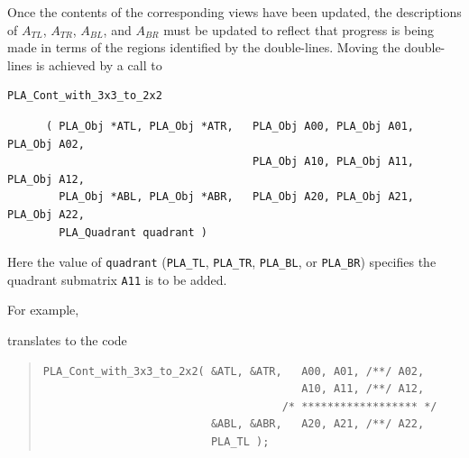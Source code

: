 Once the contents of the corresponding views have been updated, 
the descriptions of $ A_{TL} $, $ A_{TR} $, 
$ A_{BL} $, and $ A_{BR} $ must be updated 
to reflect that progress is being made in terms of the regions
identified by the double-lines.
Moving the double-lines is achieved by a call to
\begin{FlaSpec}
\begin{verbatim}
PLA_Cont_with_3x3_to_2x2
\end{verbatim}
{\footnotesize
\begin{verbatim}
      ( PLA_Obj *ATL, PLA_Obj *ATR,   PLA_Obj A00, PLA_Obj A01, PLA_Obj A02,
                                      PLA_Obj A10, PLA_Obj A11, PLA_Obj A12,
        PLA_Obj *ABL, PLA_Obj *ABR,   PLA_Obj A20, PLA_Obj A21, PLA_Obj A22,
        PLA_Quadrant quadrant )
\end{verbatim}
}
\end{FlaSpec}
Here the value of {\tt quadrant} 
({\tt PLA\_TL}, {\tt PLA\_TR},
{\tt PLA\_BL}, or {\tt PLA\_{BR}})
specifies the quadrant
submatrix {\tt A11} is to be added.

For example,
\renewcommand{\moveboundaries}{
$ \FlaTwoByTwo{ A_{TL} }{ A_{TR} }
            { A_{BL} }{ L_{BR} }
\leftarrow
\FlaThreeByThreeTL{ A_{00} }{ A_{01} }{ A_{02} }
                  { A_{10} }{ A_{11} }{ A_{12} }
                  { A_{20} }{ A_{21} }{ A_{22} }
$
}
\begin{quote}
\WSmoveboundary
\end{quote} 
translates to the code
\begin{quote}
\footnotesize
\begin{verbatim}
PLA_Cont_with_3x3_to_2x2( &ATL, &ATR,   A00, A01, /**/ A02,
                                        A10, A11, /**/ A12,
                                     /* ****************** */
                          &ABL, &ABR,   A20, A21, /**/ A22,
                          PLA_TL );
\end{verbatim}
\end{quote}

